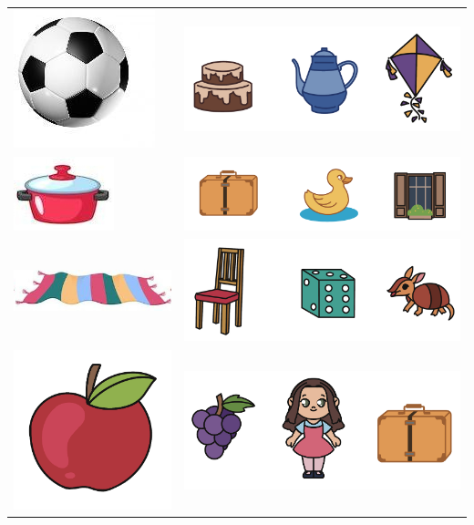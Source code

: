 \begin{table}[H]
\centering
\begin{tabular}{l|l}
\includegraphics[width=.15\textwidth]{media/image49.jpg} & \includegraphics[width=.65\textwidth]{media/image50a.png} \\
\includegraphics[width=.15\textwidth]{media/image53.jpg} & \includegraphics[width=.65\textwidth]{media/image50b.png} \\
\includegraphics[width=.15\textwidth]{media/image57.jpg} & \includegraphics[width=.65\textwidth]{media/image50c.png} \\
\includegraphics[width=.15\textwidth]{media/image61.png} & \includegraphics[width=.65\textwidth]{media/image50d.png}
\end{tabular}
\end{table}

